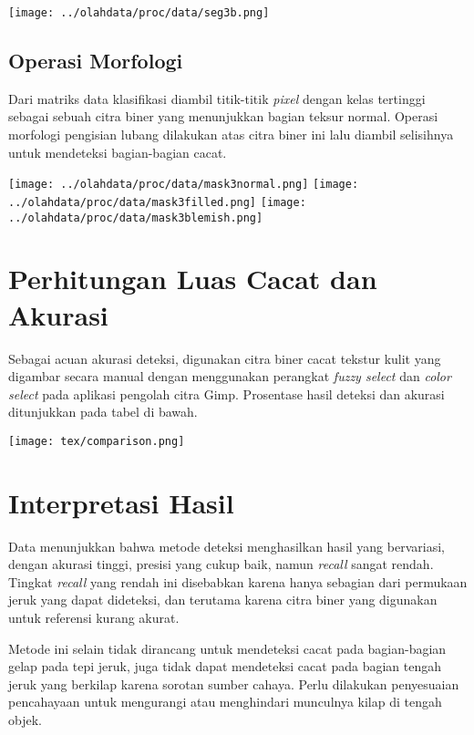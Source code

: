 \documentclass[laporan.tex]{subfiles}
\begin{document}
\texttt{[image: ../olahdata/proc/data/seg3b.png]}

\subsection{Operasi Morfologi}

Dari matriks data klasifikasi diambil titik-titik \emph{pixel} dengan kelas tertinggi sebagai sebuah citra biner yang menunjukkan bagian teksur normal. Operasi morfologi pengisian lubang dilakukan atas citra biner ini lalu diambil selisihnya untuk mendeteksi bagian-bagian cacat.

\texttt{[image: ../olahdata/proc/data/mask3normal.png]}
\texttt{[image: ../olahdata/proc/data/mask3filled.png]}
\texttt{[image: ../olahdata/proc/data/mask3blemish.png]}

\section{Perhitungan Luas Cacat dan Akurasi}

Sebagai acuan akurasi deteksi, digunakan citra biner cacat tekstur kulit yang digambar secara manual dengan menggunakan perangkat \emph{fuzzy select} dan \emph{color select} pada aplikasi pengolah citra Gimp. Prosentase hasil deteksi dan akurasi ditunjukkan pada tabel di bawah.

\texttt{[image: tex/comparison.png]}

\section{Interpretasi Hasil}

Data menunjukkan bahwa metode deteksi menghasilkan hasil yang bervariasi, dengan akurasi tinggi, presisi yang cukup baik, namun \emph{recall} sangat rendah. Tingkat \emph{recall} yang rendah ini disebabkan karena hanya sebagian dari permukaan jeruk yang dapat dideteksi, dan terutama karena citra biner yang digunakan untuk referensi kurang akurat.

Metode ini selain tidak dirancang untuk mendeteksi cacat pada bagian-bagian gelap pada tepi jeruk, juga tidak dapat mendeteksi cacat pada bagian tengah jeruk yang berkilap karena sorotan sumber cahaya. Perlu dilakukan penyesuaian pencahayaan untuk mengurangi atau menghindari munculnya kilap di tengah objek.


\end{document}
